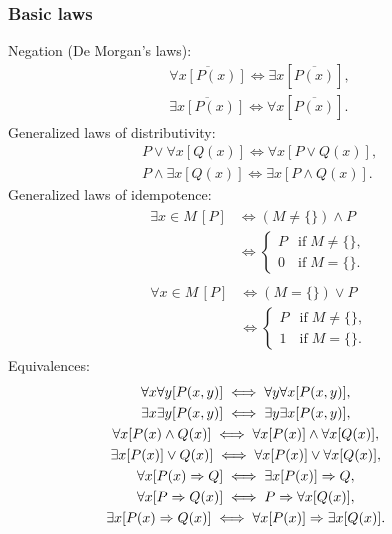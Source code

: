 \subsubsection{Basic laws}
Negation (De Morgan's laws):
\begin{gather}
\overline{\forall x[P(x)]}\iff \exists x[\overline{P(x)}],\\
\overline{\exists x[P(x)]}\iff \forall x[\overline{P(x)}].
\end{gather}
Generalized laws of distributivity:
\begin{gather}
P\lor\forall x[Q(x)] \iff \forall x[P\lor Q(x)],\\
P\land\exists x[Q(x)] \iff \exists x[P\land Q(x)].
\end{gather}
Generalized laws of idempotence:
\begin{gather}
\begin{split}
\exists x{\in}M\,[P] & \iff
(M\ne\{\})\land P\\
& \iff\begin{cases}
P & \text{if}\; M\ne\{\},\\
0 & \text{if}\; M=\{\}.
\end{cases}
\end{split}\\
\begin{split}
\forall x{\in}M\,[P]& \iff
(M=\{\})\lor P\\
&\iff\begin{cases}
P & \text{if}\; M\ne\{\},\\
1 & \text{if}\; M=\{\}.
\end{cases}
\end{split}
\end{gather}
Equivalences:
\begin{gather}
\hspace{-2em}\forall x\forall y[P(x,y)] \iff \forall y\forall x[P(x,y)],\\
\hspace{-2em}\exists x\exists y[P(x,y)] \iff \exists y\exists x[P(x,y)],\\
\hspace{-2em}\forall x[P(x)\land Q(x)] \iff \forall x[P(x)]\land\forall x[Q(x)],\\
\hspace{-2em}\exists x[P(x)]\lor Q(x)] \iff \forall x[P(x)]\lor\forall x[Q(x)],\\
\hspace{-2em}\forall x[P(x)\Rightarrow Q] \iff \exists x[P(x)]\Rightarrow Q,\\
\hspace{-2em}\forall x[P\Rightarrow Q(x)] \iff P\Rightarrow\forall x[Q(x)],\\
\hspace{-2em}\exists x[P(x)\Rightarrow Q(x)]
  \iff\forall x[P(x)]\Rightarrow\exists x[Q(x)].
\end{gather}

